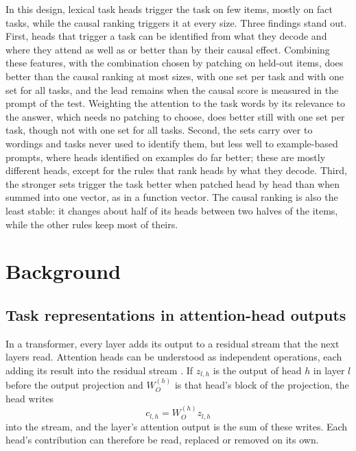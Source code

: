 \documentclass[10pt,a4paper]{article}
\begin{document}
In this design, lexical task heads trigger the task on few items, mostly on fact tasks, while the causal ranking triggers it at every size. Three findings stand out. First, heads that trigger a task can be identified from what they decode and where they attend as well as or better than by their causal effect. Combining these features, with the combination chosen by patching on held-out items, does better than the causal ranking at most sizes, with one set per task and with one set for all tasks, and the lead remains when the causal score is measured in the prompt of the test. Weighting the attention to the task words by its relevance to the answer, which needs no patching to choose, does better still with one set per task, though not with one set for all tasks. Second, the sets carry over to wordings and tasks never used to identify them, but less well to example-based prompts, where heads identified on examples do far better; these are mostly different heads, except for the rules that rank heads by what they decode. Third, the stronger sets trigger the task better when patched head by head than when summed into one vector, as in a function vector. The causal ranking is also the least stable: it changes about half of its heads between two halves of the items, while the other rules keep most of theirs.

\section{Background}\label{sec:background}

\subsection{Task representations in attention-head outputs}\label{sec:bg-fv}

In a transformer, every layer adds its output to a residual stream that the next layers read. Attention heads can be understood as independent operations, each adding its result into the residual stream \citep{elhage2021mathematical}. If $z_{l,h}$ is the output of head $h$ in layer $l$ before the output projection and $W_O^{(h)}$ is that head's block of the projection, the head writes
\begin{equation}
c_{l,h} = W_O^{(h)} z_{l,h}
\end{equation}
into the stream, and the layer's attention output is the sum of these writes. Each head's contribution can therefore be read, replaced or removed on its own.
\end{document}
